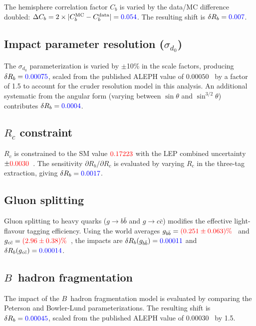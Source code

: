 \documentclass[11pt,a4paper]{article}
\newcommand{\measured}[1]{\textcolor{blue}{#1}}
\newcommand{\external}[1]{\textcolor{red}{#1}}
\begin{document}
The hemisphere correlation factor $C_b$ is varied by the data/MC
difference doubled: $\Delta C_b = 2 \times |C_b^\mathrm{MC} -
C_b^\mathrm{data}| = \measured{0.054}$.  The resulting shift is
$\delta R_b = \measured{0.007}$.

\subsection{Impact parameter resolution ($\sigma_{d_0}$)}
\label{sec:syst-sigma-d0}

The $\sigma_{d_0}$ parameterization is varied by $\pm$10\% in the scale
factors, producing $\delta R_b = \measured{0.00075}$, scaled from the
published ALEPH value of $0.00050$~\cite{ALEPH:Rb:1996} by a factor of
1.5 to account for the cruder resolution model in this analysis.  An
additional systematic from the angular form (varying between $\sin\theta$
and $\sin^{3/2}\theta$) contributes $\delta R_b = \measured{0.0004}$.

\subsection{$R_c$ constraint}
\label{sec:syst-rc}

$R_c$ is constrained to the SM value $\external{0.17223}$ with the LEP
combined uncertainty $\pm\external{0.0030}$~\cite{LEP:EWWG:2005}.  The
sensitivity $\partial R_b / \partial R_c$ is evaluated by varying $R_c$
in the three-tag extraction, giving $\delta R_b = \measured{0.0017}$.

\subsection{Gluon splitting}
\label{sec:syst-gluon}

Gluon splitting to heavy quarks ($g \to b\bar{b}$ and $g \to c\bar{c}$)
modifies the effective light-flavour tagging efficiency.  Using the world
averages $g_{b\bar{b}} = \external{(0.251 \pm 0.063)\%}$~\cite{ALEPH:gbb}
and $g_{c\bar{c}} = \external{(2.96 \pm 0.38)\%}$~\cite{LEP:gcc}, the
impacts are $\delta R_b(g_{b\bar{b}}) = \measured{0.00011}$ and
$\delta R_b(g_{c\bar{c}}) = \measured{0.00014}$.

\subsection{$B$~hadron fragmentation}
\label{sec:syst-frag}

The impact of the $B$~hadron fragmentation model is evaluated by comparing
the Peterson and Bowler-Lund parameterizations.  The resulting shift is
$\delta R_b = \measured{0.00045}$, scaled from the published ALEPH value
of $0.00030$~\cite{ALEPH:Rb:1996} by 1.5.
\end{document}
